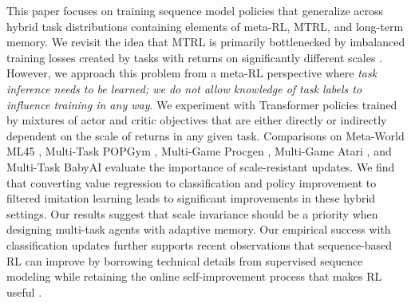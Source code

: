 This paper focuses on training sequence model policies that generalize across hybrid task distributions containing elements of meta-RL, MTRL, and long-term memory. We revisit the idea that MTRL is primarily bottlenecked by imbalanced training losses created by tasks with returns on significantly different scales \cite{hessel2019multi}. However, we approach this problem from a meta-RL perspective where \textit{task inference needs to be learned; we do not allow knowledge of task labels to influence training in any way}. We experiment with Transformer \cite{vaswani2017attention} policies trained by mixtures of actor and critic objectives that are either directly or indirectly dependent on the scale of returns in any given task. Comparisons on Meta-World ML45 \cite{yu2020meta}, Multi-Task POPGym \cite{morad2023popgym}, Multi-Game Procgen \cite{cobbe2020leveraging}, Multi-Game Atari \cite{bellemare2013arcade}, and Multi-Task BabyAI \cite{chevalier-boisvert2018babyai} evaluate the importance of scale-resistant updates. We find that converting value regression to classification \cite{hafner2023mastering} and policy improvement to filtered imitation learning \cite{wang2020critic} leads to significant improvements in these hybrid settings. Our results suggest that scale invariance should be a priority when designing multi-task agents with adaptive memory. Our empirical success with classification updates further supports recent observations that sequence-based RL can improve by borrowing technical details from supervised sequence modeling \cite{chebotar2023q, farebrother2024stop, springenberg2024offline} while retaining the online self-improvement process that makes RL useful \cite{chen2021decision, lee2022multi}.

